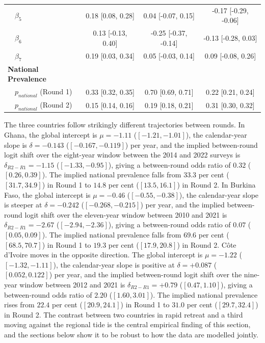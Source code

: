 \documentclass{article}
\begin{document}
\begin{table}[!h]
\begin{tabular}[t]{lccc}
\hspace{1em}~~$\beta_5$ & 0.18 [0.08, 0.28] & 0.04 [-0.07, 0.15] & -0.17 [-0.29, -0.06]\\
\hspace{1em}~~$\beta_6$ & 0.13 [-0.13, 0.40] & -0.25 [-0.37, -0.14] & -0.13 [-0.28, 0.03]\\
\addlinespace
\hspace{1em}~~$\beta_7$ & 0.19 [0.03, 0.34] & 0.05 [-0.03, 0.14] & 0.09 [-0.08, 0.26]\\
\textbf{National Prevalence} &  &  & \\
\hspace{1em}~~$p_{national}$ (Round 1) & 0.33 [0.32, 0.35] & 0.70 [0.69, 0.71] & 0.22 [0.21, 0.24]\\
\hspace{1em}~~$p_{national}$ (Round 2) & 0.15 [0.14, 0.16] & 0.19 [0.18, 0.21] & 0.31 [0.30, 0.32]\\
\bottomrule
\end{tabular}
\end{table}

The three countries follow strikingly different trajectories between
rounds. In Ghana, the global intercept is \(\mu = -1.11\)
(\([-1.21, -1.01]\)), the calendar-year slope is \(\delta = -0.143\)
(\([-0.167, -0.119]\)) per year, and the implied between-round logit
shift over the eight-year window between the 2014 and 2022 surveys is
\(\delta_{R2-R1} = -1.15\) (\([-1.33, -0.95]\)), giving a between-round
odds ratio of \(0.32\) (\([0.26, 0.39]\)). The implied national
prevalence falls from \(33.3\) per cent (\([31.7, 34.9]\)) in Round 1 to
\(14.8\) per cent (\([13.5, 16.1]\)) in Round 2. In Burkina Faso, the
global intercept is \(\mu = -0.46\) (\([-0.55, -0.38]\)), the
calendar-year slope is steeper at \(\delta = -0.242\)
(\([-0.268, -0.215]\)) per year, and the implied between-round logit
shift over the eleven-year window between 2010 and 2021 is
\(\delta_{R2-R1} = -2.67\) (\([-2.94, -2.36]\)), giving a between-round
odds ratio of \(0.07\) (\([0.05, 0.09]\)). The implied national
prevalence falls from \(69.6\) per cent (\([68.5, 70.7]\)) in Round 1 to
\(19.3\) per cent (\([17.9, 20.8]\)) in Round 2. Côte d'Ivoire moves in
the opposite direction. The global intercept is \(\mu = -1.22\)
(\([-1.32, -1.11]\)), the calendar-year slope is positive at
\(\delta = +0.087\) (\([0.052, 0.122]\)) per year, and the implied
between-round logit shift over the nine-year window between 2012 and
2021 is \(\delta_{R2-R1} = +0.79\) (\([0.47, 1.10]\)), giving a
between-round odds ratio of \(2.20\) (\([1.60, 3.01]\)). The implied
national prevalence rises from \(22.4\) per cent (\([20.9, 24.1]\)) in
Round 1 to \(31.0\) per cent (\([29.7, 32.4]\)) in Round 2. The contrast
between two countries in rapid retreat and a third moving against the
regional tide is the central empirical finding of this section, and the
sections below show it to be robust to how the data are modelled
jointly.
\end{document}
